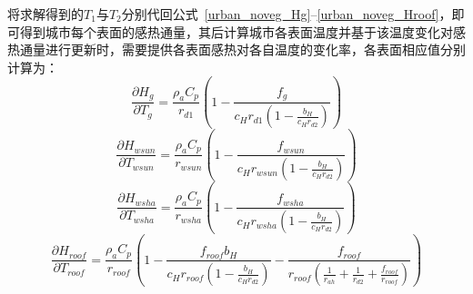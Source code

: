 将求解得到的$T_{1}$与$T_{2}$分别代回公式~\eqref{urban_noveg_Hg}--\eqref{urban_noveg_Hroof}，即可得到城市每个表面的感热通量，其后计算城市各表面温度并基于该温度变化对感热通量进行更新时，需要提供各表面感热对各自温度的变化率，各表面相应值分别计算为：
\begin{equation}
\frac{\partial H_{g}}{\partial T_{g}} = \frac{\rho _a C_p}{r_{d1}} \left(1-\frac{f_g}{c_{H} r_{d1} \left(1-\frac{b_H}{c_{H} r_{d2}}\right)}\right)
\end{equation}
%
\begin{equation}
\frac{\partial H_{wsun}}{\partial T_{wsun}} = \frac{\rho _a C_p}{r_{wsun}} \left(1-\frac{f_{wsun}}{c_{H} r_{wsun} \left(1-\frac{b_H}{c_{H} r_{d2}}\right)}\right)
\end{equation}
%
\begin{equation}
\frac{\partial H_{wsha}}{\partial T_{wsha}} = \frac{\rho _a C_p}{r_{wsha}} \left(1-\frac{f_{wsha}}{c_{H} r_{wsha} \left(1-\frac{b_H}{c_{H} r_{d2}}\right)}\right)
\end{equation}
%
\begin{equation}
\frac{\partial H_{roof}}{\partial T_{roof}} = \frac{\rho _a C_p}{r_{roof}} \left(1-\frac{f_{roof} b_{H}}{c_{H} r_{roof} \left(1-\frac{b_H}{c_{H} r_{d2}}\right)}-\frac{f_{roof}}{r_{roof}\left(\frac{1}{r_{ah}}+\frac{1}{r_{d2}}+\frac{f_{roof}}{r_{roof}}\right)}\right)
\end{equation}

